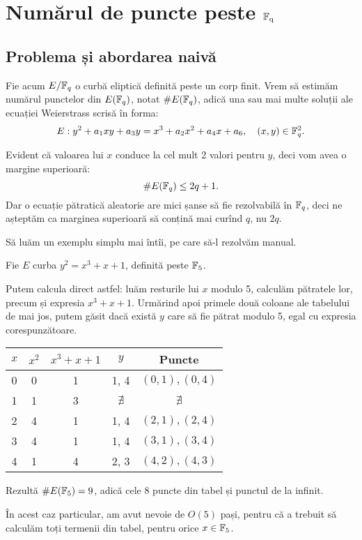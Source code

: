 
\chapter{Numărul de puncte peste $ \mathbb{F}_{\text{q}} $}

\section{Problema și abordarea naivă}

Fie acum $ E/\mathbb{F}_q $ o curbă eliptică definită peste un corp finit.
Vrem să estimăm numărul punctelor din $ E(\mathbb{F}_q) $, notat $ \# E(\mathbb{F}_q) $,
adică una sau mai multe soluții ale ecuației Weierstrass scrisă în forma:
\[
  E : y^2 + a_1 xy + a_3 y = x^3 + a_2 x^2 + a_4 x + a_6, \quad %
  (x, y) \in \FF_q^2.
\]

Evident că valoarea lui $ x $ conduce la cel mult 2 valori pentru $ y $,
deci vom avea o margine superioară:
\[
  \# E(\mathbb{F}_q) \leq 2q + 1.
\]
Dar o ecuație pătratică aleatorie are mici șanse să fie rezolvabilă
în $ \mathbb{F}_q $, deci ne așteptăm ca marginea superioară să conțină mai curînd
$ q $, nu $ 2q $.

\begin{example}\label{exm:puncte}
  Să luăm un exemplu simplu mai întîi, pe care să-l rezolvăm manual.

  Fie $ E $ curba $ y^2 = x^3 + x + 1 $, definită peste $ \mathbb{F}_5 $.

  Putem calcula direct astfel: luăm resturile lui $ x $ modulo 5, calculăm
  pătratele lor, precum și expresia $ x^3 + x + 1 $. Urmărind apoi primele
  două coloane ale tabelului de mai jos, putem găsit dacă există $ y $
  care să fie pătrat modulo 5, egal cu expresia corespunzătoare.

  \begin{center}
    \begin{tabular}{|c|c|c|c|c|}
      \hline
      $ x $ & $ x^2 $ & $ x^3 + x + 1 $ & $ y $ & Puncte \\
      \hline
      0 & 0 & 1 & 1, 4 & $ (0, 1), (0, 4) $ \\
      1 & 1 & 3 & $ \nexists $ & $ \nexists $ \\
      2 & 4 & 1 & 1, 4 & $ (2, 1), (2, 4) $ \\
      3 & 4 & 1 & 1, 4 & $ (3, 1), (3, 4) $ \\
      4 & 1 & 4 & 2, 3 & $ (4, 2), (4, 3) $ \\
                         \hline
    \end{tabular}
  \end{center}

  Rezultă $ \# E(\mathbb{F}_5) = 9 $, adică cele 8 puncte din tabel și punctul de la
  infinit.

  În acest caz particular, am avut nevoie de $ O(5) $ pași, pentru că a
  trebuit să calculăm toți termenii din tabel, pentru orice $ x \in \mathbb{F}_5 $.
\end{example}


